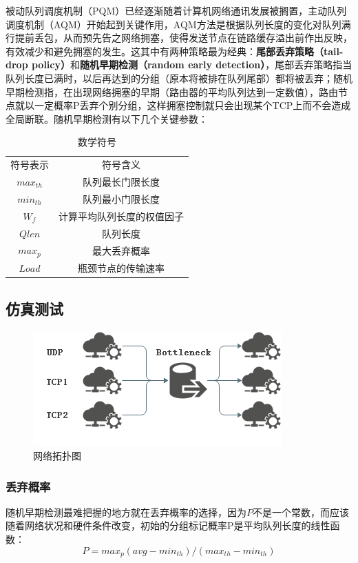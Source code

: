 \documentclass{article}
\begin{document}
被动队列调度机制（PQM）已经逐渐随着计算机网络通讯发展被搁置，主动队列调度机制（AQM）开始起到关键作用，AQM方法是根据队列长度的变化对队列满行提前丢包，从而预先告之网络拥塞，使得发送节点在链路缓存溢出前作出反映，有效减少和避免拥塞的发生。这其中有两种策略最为经典：\textbf{尾部丢弃策略（tail-drop policy）}和\textbf{随机早期检测（random early detection）}，尾部丢弃策略指当队列长度已满时，以后再达到的分组（原本将被排在队列尾部）都将被丢弃；随机早期检测指，在出现网络拥塞的早期（路由器的平均队列达到一定数值），路由节点就以一定概率P丢弃个别分组，这样拥塞控制就只会出现某个TCP上而不会造成全局断联。随机早期检测有以下几个关键参数：

\begin{table}[H]
	\centering
	\caption{数学符号}
	\label{table}
	\begin{tabular}{cc}
		\hline
		符号表示&符号含义\\
		$max_{th}$ & 队列最长门限长度\\
		$min_{th}$ & 队列最小门限长度\\
		$W_f$ & 计算平均队列长度的权值因子\\
		$Qlen$ & 队列长度\\
		$max_p$ & 最大丢弃概率\\
		$Load$ & 瓶颈节点的传输速率\\
		\hline
	\end{tabular}
\end{table}

\subsection{仿真测试}

\begin{figure}[H]
	\centering
	\includegraphics[scale=0.6]{picture/topology1.png}
	\caption{网络拓扑图}
	\label{fig:topology1}
\end{figure}

\subsubsection{丢弃概率}
随机早期检测最难把握的地方就在丢弃概率的选择，因为$P$不是一个常数，而应该随着网络状况和硬件条件改变，初始的分组标记概率P是平均队列长度的线性函数：
\begin{equation*}
	P=max_p(avg-min_{th})/(max_{th}-min_{th})
\end{equation*}
\end{document}

